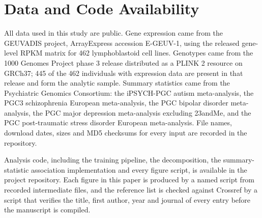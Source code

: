 \documentclass[conference]{IEEEtran}
\begin{document}
\section*{Data and Code Availability}
All data used in this study are public. Gene expression came from the GEUVADIS project, ArrayExpress accession E-GEUV-1, using the released gene-level RPKM matrix for 462 lymphoblastoid cell lines. Genotypes came from the 1000 Genomes Project phase 3 release distributed as a PLINK 2 resource on GRCh37; 445 of the 462 individuals with expression data are present in that release and form the analytic sample. Summary statistics came from the Psychiatric Genomics Consortium: the iPSYCH-PGC autism meta-analysis, the PGC3 schizophrenia European meta-analysis, the PGC bipolar disorder meta-analysis, the PGC major depression meta-analysis excluding 23andMe, and the PGC post-traumatic stress disorder European meta-analysis. File names, download dates, sizes and MD5 checksums for every input are recorded in the repository.

Analysis code, including the training pipeline, the decomposition, the summary-statistic association implementation and every figure script, is available in the project repository. Each figure in this paper is produced by a named script from recorded intermediate files, and the reference list is checked against Crossref by a script that verifies the title, first author, year and journal of every entry before the manuscript is compiled.



\end{document}
